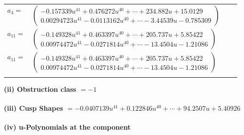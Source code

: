 \documentclass[1p]{elsarticle_modified}
\theoremstyle{definition}
\begin{document}
\begin{tabular}{m{7pt} m{180pt} m{7pt} m{180pt} }
\flushright $a_{4}=$&$\begin{pmatrix}-0.157339 u^{41}+0.476272 u^{40}+\cdots+234.882 u+15.0129\\0.00294723 u^{41}-0.0113162 u^{40}+\cdots-3.44539 u-0.785309\end{pmatrix}$ \\
\flushright $a_{11}=$&$\begin{pmatrix}-0.149328 u^{41}+0.463397 u^{40}+\cdots+205.737 u+5.85422\\0.00974472 u^{41}-0.0271814 u^{40}+\cdots-13.4504 u-1.21086\end{pmatrix}$\\ \flushright $a_{11}=$&$\begin{pmatrix}-0.149328 u^{41}+0.463397 u^{40}+\cdots+205.737 u+5.85422\\0.00974472 u^{41}-0.0271814 u^{40}+\cdots-13.4504 u-1.21086\end{pmatrix}$\\&\end{tabular}
\flushleft \textbf{(ii) Obstruction class $= -1$}\\~\\
\flushleft \textbf{(iii) Cusp Shapes $= -0.0407139 u^{41}+0.122846 u^{40}+\cdots+94.2507 u+5.40926$}\\~\\
\newpage\renewcommand{\arraystretch}{1}
\flushleft \textbf{(iv) u-Polynomials at the component}\newline \\
\end{document}
